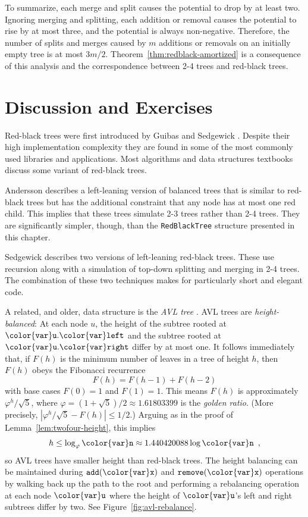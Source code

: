 \documentclass[10pt]{book}
\newcommand{\figref}[1]{Figure~\ref{fig:#1}}
\theoremstyle{plain}
\newcommand{\thmref}[1]{Theorem~\ref{thm:#1}}
\newcommand{\lemref}[1]{Lemma~\ref{lem:#1}}
\theoremstyle{definition}
\begin{document}
To summarize, each merge and split causes the potential to drop by
at least two.  Ignoring merging and splitting, each addition or removal
causes the potential to rise by at most three, and the potential is always
non-negative.  Therefore, the number of splits and merges caused by $m$
additions or removals on an initially empty tree is at most $3m/2$.
\thmref{redblack-amortized} is a consequence of this analysis and the
correspondence between 2-4 trees and red-black trees.

\section{Discussion and Exercises}

Red-black trees were first introduced by Guibas and Sedgewick \cite{gs78}.
Despite their high implementation complexity they are found in some of
the most commonly used libraries and applications.  Most algorithms and
data structures textbooks discuss some variant of red-black trees.

Andersson \cite{a93} describes a left-leaning version of balanced trees
that is similar to red-black trees but has the additional constraint
that any node has at most one red child.  This implies that these trees
simulate 2-3 trees rather than 2-4 trees.  They are significantly simpler,
though, than the \texttt{RedBlackTree} structure presented in this chapter.

Sedgewick \cite{s08} describes two versions of left-leaning red-black
trees.  These use recursion along with a simulation of top-down splitting
and merging in 2-4 trees. The combination of these two techniques makes
for particularly short and elegant code.

A related, and older, data structure is the \emph{AVL tree} \cite{avl62}.
%
AVL trees are \emph{height-balanced}:
%
%
At each node $u$, the height
of the subtree rooted at \ensuremath{\mathtt{{\color{var}u}.{\color{var}left}}} and the subtree rooted at \ensuremath{\mathtt{{\color{var}u}.{\color{var}right}}}
differ by at most one.  It follows immediately that, if $F(h)$ is the
minimum number of leaves in a tree of height $h$, then $F(h)$ obeys the
Fibonacci recurrence
\[
   F(h) = F(h-1) + F(h-2)
\]
with base cases $F(0)=1$ and $F(1)=1$.  This means $F(h)$ is approximately
$\varphi^h/\sqrt{5}$, where $\varphi=(1+\sqrt{5})/2\approx1.61803399$ is the
\emph{golden ratio}.  (More precisely, $|\varphi^h/\sqrt{5} - F(h)|\le 1/2$.)
Arguing as in the proof of \lemref{twofour-height}, this implies
\[
   h \le \log_\varphi \ensuremath{\mathtt{{\color{var}n}}} \approx 1.440420088\log \ensuremath{\mathtt{{\color{var}n}}} \enspace ,
\]
so AVL trees have smaller height than red-black trees.  The height
balancing can be maintained during \ensuremath{\mathtt{add({\color{var}x})}} and \ensuremath{\mathtt{remove({\color{var}x})}} operations
by walking back up the path to the root and performing a rebalancing
operation at each node \ensuremath{\mathtt{{\color{var}u}}} where the height of \ensuremath{\mathtt{{\color{var}u}}}'s left and right
subtrees differ by two.  See \figref{avl-rebalance}.
\end{document}
